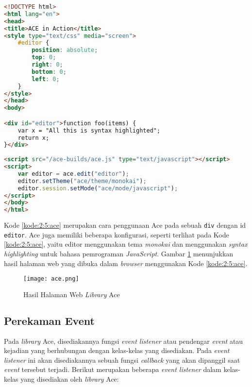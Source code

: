 \begin{lstlisting}[language={html}, caption={Contoh kode penggunaan Ace}, label={kode:2:5:ace}]
<!DOCTYPE html>
<html lang="en">
<head>
<title>ACE in Action</title>
<style type="text/css" media="screen">
	#editor { 
		position: absolute;
		top: 0;
		right: 0;
		bottom: 0;
		left: 0;
	}
</style>
</head>
<body>

<div id="editor">function foo(items) {
	var x = "All this is syntax highlighted";
	return x;
}</div>
	
<script src="/ace-builds/ace.js" type="text/javascript"></script>
<script>
	var editor = ace.edit("editor");
	editor.setTheme("ace/theme/monokai");
	editor.session.setMode("ace/mode/javascript");
</script>
</body>
</html>
\end{lstlisting}

Kode \ref{kode:2:5:ace} merupakan cara penggunaan Ace pada sebuah \texttt{div} dengan id \texttt{editor}. Ace juga memiliki beberapa konfigurasi, seperti terlihat pada Kode \ref{kode:2:5:ace}, yaitu editor menggunakan tema \textit{monokai} dan menggunakan \textit{syntax highlighting} untuk bahasa pemrograman \textit{JavaScript}. Gambar \ref{fig:2:5:ace} menunjukkan hasil halaman web yang dibuka dalam \textit{browser} menggunakan Kode \ref{kode:2:5:ace}.

\begin{figure}[H]
	\centering
	\texttt{[image: ace.png]}
	\caption{Hasil Halaman Web \textit{Library} Ace}
	\label{fig:2:5:ace}
	\vspace{-1cm}
\end{figure}

\subsection{Perekaman Event}

Pada \textit{library} Ace, disediakannya fungsi \textit{event listener} atau pendengar \textit{event} atau kejadian yang berhubungan dengan kelas-kelas yang disediakan. Pada \textit{event listener} ini akan disediakannya sebuah fungsi \textit{callback} yang akan dipanggil saat \textit{event} tersebut terjadi. Berikut merupakan beberapa \textit{event listener} dalam kelas-kelas yang disediakan oleh \textit{library} Ace:


